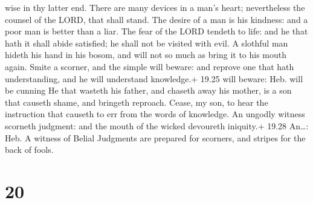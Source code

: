 wise in thy latter end.  There are many devices in a man's
heart; nevertheless the counsel of the LORD, that shall stand.
 The desire of a man is his kindness: and a poor man is
better than a liar.  The fear of the LORD tendeth to life:
and he that hath it shall abide satisfied; he shall not be visited with
evil.  A slothful man hideth his hand in his bosom, and
will not so much as bring it to his mouth again.  Smite a
scorner, and the simple will beware: and reprove one that hath
understanding, and he will understand knowledge.+ 19.25 will beware:
Heb. will be cunning  He that wasteth his father, and
chaseth away his mother, is a son that causeth shame, and bringeth
reproach.  Cease, my son, to hear the instruction that
causeth to err from the words of knowledge.  An ungodly
witness scorneth judgment: and the mouth of the wicked devoureth
iniquity.+ 19.28 An\ldots: Heb. A witness of Belial 
Judgments are prepared for scorners, and stripes for the back of fools.

\hypertarget{section-19}{%
\section{20}\label{section-19}}

